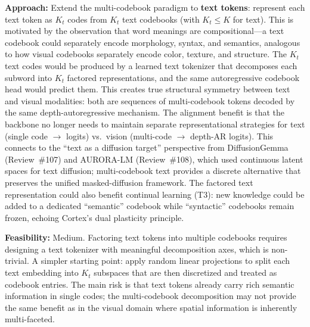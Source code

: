 \documentclass[11pt,a4paper]{article}
\begin{document}
\textbf{Approach:} Extend the multi-codebook paradigm to \textbf{text tokens}: represent each text token as $K_t$ codes from $K_t$ text codebooks (with $K_t \leq K$ for text). This is motivated by the observation that word meanings are compositional---a text codebook could separately encode morphology, syntax, and semantics, analogous to how visual codebooks separately encode color, texture, and structure. The $K_t$ text codes would be produced by a learned text tokenizer that decomposes each subword into $K_t$ factored representations, and the same autoregressive codebook head would predict them. This creates true structural symmetry between text and visual modalities: both are sequences of multi-codebook tokens decoded by the same depth-autoregressive mechanism. The alignment benefit is that the backbone no longer needs to maintain separate representational strategies for text (single code $\to$ logits) vs.\ vision (multi-code $\to$ depth-AR logits). This connects to the ``text as a diffusion target'' perspective from DiffusionGemma (Review~\#107) and AURORA-LM (Review~\#108), which used continuous latent spaces for text diffusion; multi-codebook text provides a discrete alternative that preserves the unified masked-diffusion framework. The factored text representation could also benefit continual learning (T3): new knowledge could be added to a dedicated ``semantic'' codebook while ``syntactic'' codebooks remain frozen, echoing Cortex's dual plasticity principle.

\textbf{Feasibility:} Medium. Factoring text tokens into multiple codebooks requires designing a text tokenizer with meaningful decomposition axes, which is non-trivial. A simpler starting point: apply random linear projections to split each text embedding into $K_t$ subspaces that are then discretized and treated as codebook entries. The main risk is that text tokens already carry rich semantic information in single codes; the multi-codebook decomposition may not provide the same benefit as in the visual domain where spatial information is inherently multi-faceted.
\end{document}
